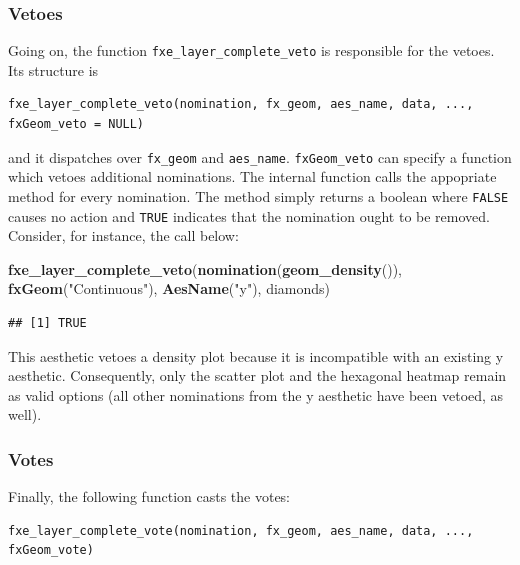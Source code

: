 \documentclass[]{report}
\newenvironment{Shaded}{\begin{snugshade}}{\end{snugshade}}
\newcommand{\KeywordTok}[1]{\textcolor[rgb]{0.13,0.29,0.53}{\textbf{#1}}}
\newcommand{\StringTok}[1]{\textcolor[rgb]{0.31,0.60,0.02}{#1}}
\newcommand{\NormalTok}[1]{#1}
\theoremstyle{definition}
\theoremstyle{definition}
\theoremstyle{definition}
\theoremstyle{remark}
\begin{document}
\subsubsection{Vetoes}\label{vetoes}

Going on, the function \texttt{fxe\_layer\_complete\_veto} is
responsible for the vetoes. Its structure is

\begin{verbatim}
fxe_layer_complete_veto(nomination, fx_geom, aes_name, data, ..., fxGeom_veto = NULL)
\end{verbatim}

and it dispatches over \texttt{fx\_geom} and \texttt{aes\_name}.
\texttt{fxGeom\_veto} can specify a function which vetoes additional
nominations. The internal function calls the appopriate method for every
nomination. The method simply returns a boolean where \texttt{FALSE}
causes no action and \texttt{TRUE} indicates that the nomination ought
to be removed. Consider, for instance, the call below:

\begin{Shaded}
\begin{Highlighting}[]
\KeywordTok{fxe_layer_complete_veto}\NormalTok{(}\KeywordTok{nomination}\NormalTok{(}\KeywordTok{geom_density}\NormalTok{()), }\KeywordTok{fxGeom}\NormalTok{(}\StringTok{"Continuous"}\NormalTok{), }\KeywordTok{AesName}\NormalTok{(}\StringTok{"y"}\NormalTok{), diamonds)}
\end{Highlighting}
\end{Shaded}

\begin{verbatim}
## [1] TRUE
\end{verbatim}

This aesthetic vetoes a density plot because it is incompatible with an
existing y aesthetic. Consequently, only the scatter plot and the
hexagonal heatmap remain as valid options (all other nominations from
the y aesthetic have been vetoed, as well).

\subsubsection{Votes}\label{votes}

Finally, the following function casts the votes:

\begin{verbatim}
fxe_layer_complete_vote(nomination, fx_geom, aes_name, data, ..., fxGeom_vote)
\end{verbatim}
\end{document}
